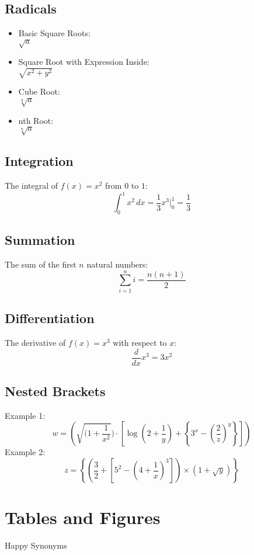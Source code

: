 \documentclass[12pt,a4paper]{article}
\begin{document}
	\pagebreak
	
	\subsection{Radicals}
	\begin{itemize}
		\item Basic Square Roots:\\
		\(\sqrt{a}\)
		\item Square Root with Expression Inside:\\ \(\sqrt{x^2 + y^2}\)
		\item Cube Root:\\
		\(\sqrt[3]{a}\)
		\item nth Root:\\
		\(\sqrt[n]{a}\)
	\end{itemize}
	
	\subsection{Integration}
	The integral of $f(x) = x^2$ from $0$ to $1$:
	\[
	\int_{0}^{1} x^2 \,dx = \frac{1}{3}x^3 \Big|_0^1 = \frac{1}{3}
	\]
	
	\subsection{Summation}
	The sum of the first $n$ natural numbers:
	\[
	\sum_{i=1}^n i = \frac{n(n+1)}{2}
	\]
	\newpage
	\subsection{Differentiation}
	The derivative of $f(x) = x^3$ with respect to $x$:
	\[
	\frac{d}{dx}x^3 = 3x^2
	\]
	
	\subsection{Nested Brackets}
	Example 1:
	\[
	w = \left( \sqrt{(1 + \frac{1}{x^2}}) \cdot \left[ \log \left( 2 + \frac{1}{y} \right) + \left\{ 3^x - \left( \frac{2}{z} \right)^y \right\} \right]\right)
	\]
	Example 2:
	\[
	z = \left\{ \left( \frac{3}{2} + \left[ 5^2 - \left( 4 + \frac{1}{x} \right)^3 \right] \right) \times \left( 1 + \sqrt{y} \right) \right\}
	\]
	
	\pagebreak
	
	\section{Tables and Figures}
	Happy Synonyms
	
\end{document}

